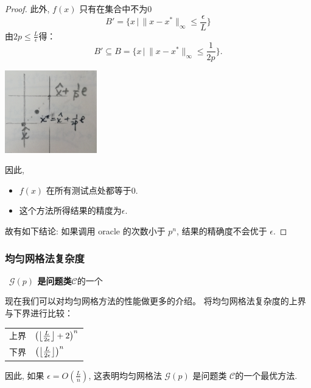 \documentclass[handout]{beamer}
\begin{document}
\begin{frame}[allowframebreaks]
\begin{proof}
此外, $f(x)$ 只有在集合中不为0
\begin{equation*}
    B' = \{x\,|\, \|x-x^*\|_{\infty}^{}\leq \frac{\epsilon}{L}\}
\end{equation*}
由$2p \leq \frac{L}{\epsilon}$得：
\begin{equation*}
    B' \subseteq B = \{x\,|\, \|x-x^*\|_{\infty}^{} \leq \frac{1}{2p}\}.
\end{equation*}

  \begin{flushright}
  \includegraphics[width=0.3\textwidth]{figure/fig_2_theorem_1_1_2.png}
  \end{flushright}

因此,
\begin{itemize}
    \item $f(x)$ 在所有测试点处都等于0.
    \item 这个方法所得结果的精度为$\epsilon$.
\end{itemize}

故有如下结论: 如果调用 oracle 的次数小于 $p^n$, 结果的精确度不会优于 $\epsilon$.

\end{proof}
\end{frame}


\begin{frame}
\frametitle{均匀网格法复杂度}
\
\textbf{$\mathcal{G}(p)$ 是问题类$\mathcal{C}$}的一个 
\bigskip

现在我们可以对均匀网格方法的性能做更多的介绍。
将均匀网格法复杂度的上界与下界进行比较：

\bigskip
\begin{tabular}{ll}
 上界& $ \left( \big{\lfloor}\frac{L}{2\epsilon} \big{\rfloor} +2 \right)_{}^n$ \\
 下界 & $ \left( \big{\lfloor}\frac{L}{2\epsilon} \big{\rfloor} \right)_{}^n$ \\
\end{tabular}

\bigskip

因此, 如果 $\epsilon = O(\frac{L}{n})$, 
这表明均匀网格法 $\mathcal{G}(p)$ 是问题类 $\mathcal{C}$的一个最优方法.


\end{frame}
\end{document}
